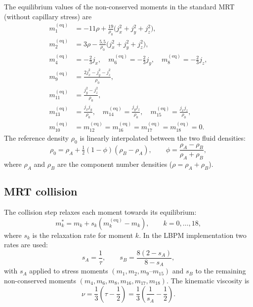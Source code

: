 \documentclass[11pt,a4paper]{article}
\begin{document}
The equilibrium values of the non-conserved moments in the standard MRT
(without capillary stress) are
\begin{align}
  m_1^{(\text{eq})} &= -11\rho + \frac{19}{\rho_0}
    \bigl(j_x^2+j_y^2+j_z^2\bigr), \label{eq:m1eq}\\
  m_2^{(\text{eq})} &= 3\rho - \frac{5.5}{\rho_0}
    \bigl(j_x^2+j_y^2+j_z^2\bigr), \\
  m_4^{(\text{eq})} &= -\tfrac{2}{3}j_x, \quad
  m_6^{(\text{eq})} = -\tfrac{2}{3}j_y, \quad
  m_8^{(\text{eq})} = -\tfrac{2}{3}j_z, \\
  m_9^{(\text{eq})} &= \frac{2j_x^2 - j_y^2 - j_z^2}{\rho_0}, \\
  m_{11}^{(\text{eq})} &= \frac{j_y^2 - j_z^2}{\rho_0}, \\
  m_{13}^{(\text{eq})} &= \frac{j_x j_y}{\rho_0}, \quad
  m_{14}^{(\text{eq})} = \frac{j_y j_z}{\rho_0}, \quad
  m_{15}^{(\text{eq})} = \frac{j_x j_z}{\rho_0}, \\
  m_{10}^{(\text{eq})} &= m_{12}^{(\text{eq})} = 
  m_{16}^{(\text{eq})} = m_{17}^{(\text{eq})} = m_{18}^{(\text{eq})} = 0 .
\end{align}
The reference density $\rho_0$ is linearly interpolated between the
two fluid densities:
\begin{equation}
  \rho_0 = \rho_A + \tfrac{1}{2}(1-\phi)(\rho_B - \rho_A), \qquad
  \phi = \frac{\rho_A - \rho_B}{\rho_A + \rho_B} ,
\end{equation}
where $\rho_A$ and $\rho_B$ are the component number densities ($\rho =
\rho_A + \rho_B$).

\subsection{MRT collision}

The collision step relaxes each moment towards its equilibrium:
\begin{equation}
  m_k^* = m_k + s_k\!\left(m_k^{(\text{eq})} - m_k\right), \qquad k=0,\ldots,18,
  \label{eq:collision}
\end{equation}
where $s_k$ is the relaxation rate for moment $k$.  In the LBPM
implementation two rates are used:
\begin{equation}
  s_A = \frac{1}{\tau}, \qquad
  s_B = \frac{8(2-s_A)}{8-s_A},
  \label{eq:relaxrates}
\end{equation}
with $s_A$ applied to stress moments $(m_1,m_2,m_9\text{--}m_{15})$ and
$s_B$ to the remaining non-conserved moments $(m_4,m_6,m_8,m_{16},m_{17},m_{18})$.
The kinematic viscosity is
\begin{equation}
  \nu = \frac{1}{3}\!\left(\tau - \frac{1}{2}\right)
  = \frac{1}{3}\!\left(\frac{1}{s_A} - \frac{1}{2}\right).
  \label{eq:viscosity}
\end{equation}
\end{document}
